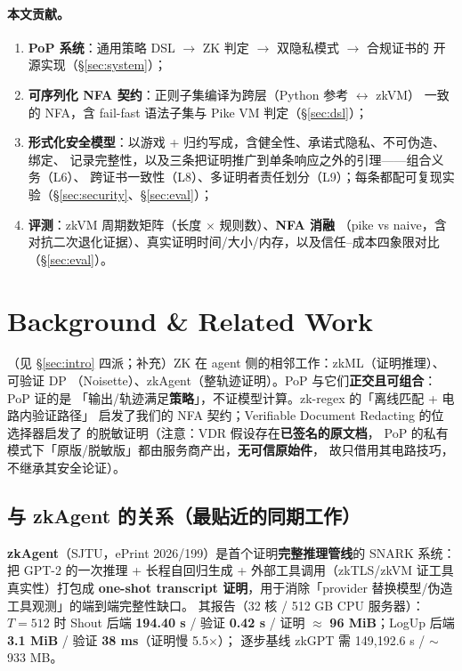 \documentclass[11pt,a4paper]{article}
\newcommand{\code}[1]{\texttt{\detokenize{#1}}}
\newcommand{\lem}[1]{\texorpdfstring{\textsc{L#1}}{L#1}}
\begin{document}
\paragraph{本文贡献。}
\begin{enumerate}[leftmargin=1.6em,itemsep=2pt]
  \item \textbf{PoP 系统}：通用策略 DSL $\to$ ZK 判定 $\to$ 双隐私模式 $\to$ 合规证书的
        开源实现（\S\ref{sec:system}）；
  \item \textbf{可序列化 NFA 契约}：正则子集编译为跨层（Python 参考 $\leftrightarrow$ zkVM）
        一致的 NFA，含 fail-fast 语法子集与 Pike VM 判定（\S\ref{sec:dsl}）；
  \item \textbf{形式化安全模型}：以游戏 + 归约写成，含健全性、承诺式隐私、不可伪造、绑定、
        记录完整性，以及三条把证明推广到单条响应之外的引理——组合义务（\lem{6}）、
        跨证书一致性（\lem{8}）、多证明者责任划分（\lem{9}）；每条都配可复现实验（\S\ref{sec:security}、\S\ref{sec:eval}）；
  \item \textbf{评测}：zkVM 周期数矩阵（长度 $\times$ 规则数）、\textbf{NFA 消融}
        （pike vs naive，含对抗二次退化证据）、真实证明时间/大小/内存，以及信任--成本四象限对比（\S\ref{sec:eval}）。
\end{enumerate}

\section{Background \& Related Work}
\label{sec:related}

（见 \S\ref{sec:intro} 四派；补充）ZK 在 agent 侧的相邻工作：zkML（证明推理）、可验证 DP
（Noisette）、zkAgent（整轨迹证明）。PoP 与它们\textbf{正交且可组合}：PoP 证的是
「输出/轨迹满足\textbf{策略}」，不证模型计算。zk-regex 的「离线匹配 + 电路内验证路径」
启发了我们的 NFA 契约；Verifiable Document Redacting 的位选择器启发了
\code{mask_covered} 的脱敏证明（注意：VDR 假设存在\textbf{已签名的原文档}，
PoP 的私有模式下「原版/脱敏版」都由服务商产出，\textbf{无可信原始件}，
故只借用其电路技巧，不继承其安全论证）。

\subsection{与 zkAgent 的关系（最贴近的同期工作）}
\label{sec:zkagent}

\textbf{zkAgent}（SJTU，ePrint 2026/199）是首个证明\textbf{完整推理管线}的 SNARK 系统：
把 GPT-2 的一次推理 + 长程自回归生成 + 外部工具调用（zkTLS/zkVM 证工具真实性）打包成
\textbf{one-shot transcript 证明}，用于消除「provider 替换模型/伪造工具观测」的端到端完整性缺口。
其报告（32 核 / 512 GB CPU 服务器）：$T=512$ 时 Shout 后端 \textbf{194.40 s} / 验证 \textbf{0.42 s} /
证明 $\approx$ \textbf{96 MiB}；LogUp 后端 \textbf{3.1 MiB} / 验证 \textbf{38 ms}（证明慢 5.5$\times$）；
逐步基线 zkGPT 需 149{,}192.6 s / $\sim$933 MB。
\end{document}
